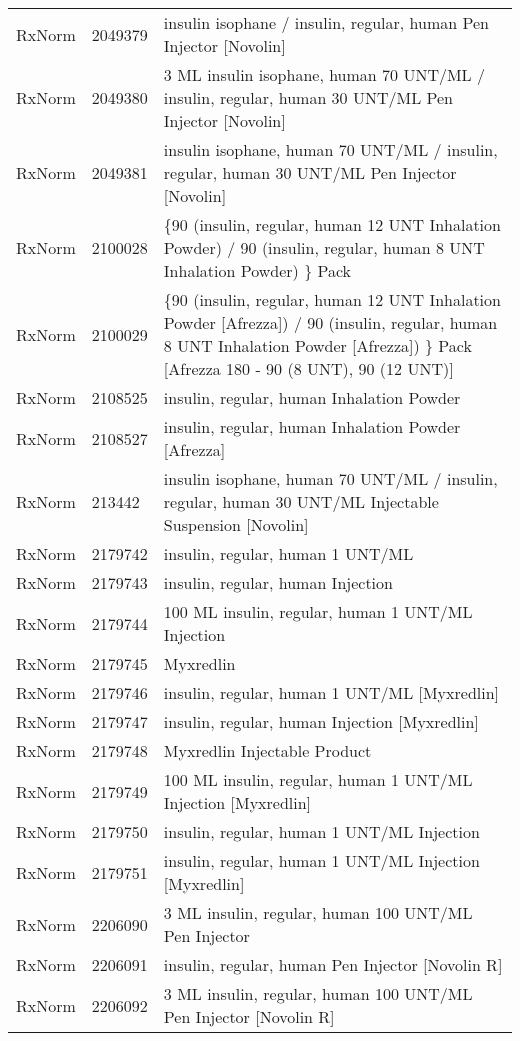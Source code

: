 \begin{longtable}{p{}p{}p{}}
  RxNorm & 2049379 & insulin isophane / insulin, regular, human Pen Injector [Novolin] \\ 
  RxNorm & 2049380 & 3 ML insulin isophane, human 70 UNT/ML / insulin, regular, human 30 UNT/ML Pen Injector [Novolin] \\ 
  RxNorm & 2049381 & insulin isophane, human 70 UNT/ML / insulin, regular, human 30 UNT/ML Pen Injector [Novolin] \\ 
  RxNorm & 2100028 & \{90 (insulin, regular, human 12 UNT Inhalation Powder) / 90 (insulin, regular, human 8 UNT Inhalation Powder) \} Pack \\ 
  RxNorm & 2100029 & \{90 (insulin, regular, human 12 UNT Inhalation Powder [Afrezza]) / 90 (insulin, regular, human 8 UNT Inhalation Powder [Afrezza]) \} Pack [Afrezza 180 - 90 (8 UNT), 90 (12 UNT)] \\ 
  RxNorm & 2108525 & insulin, regular, human Inhalation Powder \\ 
  RxNorm & 2108527 & insulin, regular, human Inhalation Powder [Afrezza] \\ 
  RxNorm & 213442 & insulin isophane, human 70 UNT/ML / insulin, regular, human 30 UNT/ML Injectable Suspension [Novolin] \\ 
  RxNorm & 2179742 & insulin, regular, human 1 UNT/ML \\ 
  RxNorm & 2179743 & insulin, regular, human Injection \\ 
  RxNorm & 2179744 & 100 ML insulin, regular, human 1 UNT/ML Injection \\ 
  RxNorm & 2179745 & Myxredlin \\ 
  RxNorm & 2179746 & insulin, regular, human 1 UNT/ML [Myxredlin] \\ 
  RxNorm & 2179747 & insulin, regular, human Injection [Myxredlin] \\ 
  RxNorm & 2179748 & Myxredlin Injectable Product \\ 
  RxNorm & 2179749 & 100 ML insulin, regular, human 1 UNT/ML Injection [Myxredlin] \\ 
  RxNorm & 2179750 & insulin, regular, human 1 UNT/ML Injection \\ 
  RxNorm & 2179751 & insulin, regular, human 1 UNT/ML Injection [Myxredlin] \\ 
  RxNorm & 2206090 & 3 ML insulin, regular, human 100 UNT/ML Pen Injector \\ 
  RxNorm & 2206091 & insulin, regular, human Pen Injector [Novolin R] \\ 
  RxNorm & 2206092 & 3 ML insulin, regular, human 100 UNT/ML Pen Injector [Novolin R] \\ 

\end{longtable}
